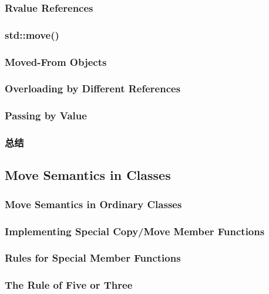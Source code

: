 \documentclass[11pt,a4paper,UTF8]{ctexart}
\begin{document}
		\subsubsection{Rvalue References}
		\subsubsection{std::move()}
		\subsubsection{Moved-From Objects}
		\subsubsection{Overloading by Different References}
		\subsubsection{Passing by Value}
		\subsubsection{总结}
	\subsection{Move Semantics in Classes}
		\subsubsection{Move Semantics in Ordinary Classes}
		\subsubsection{Implementing Special Copy/Move Member Functions}
		\subsubsection{Rules for Special Member Functions}
		\subsubsection{The Rule of Five or Three}
\end{document}
